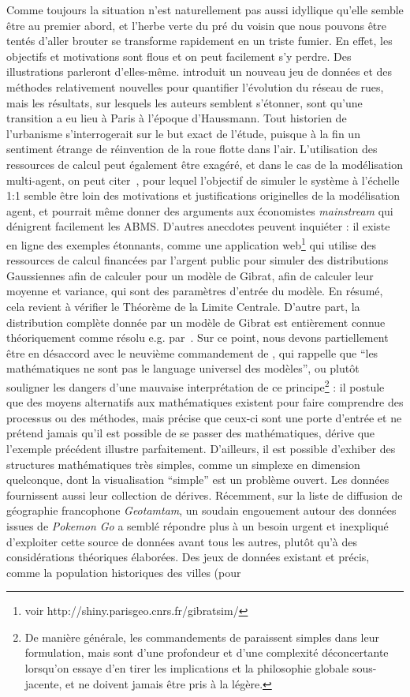 {Comme toujours la situation n'est naturellement pas aussi idyllique qu'elle semble être au premier abord, et l'herbe verte du pré du voisin que nous pouvons être tentés d'aller brouter se transforme rapidement en un triste fumier. En effet, les objectifs et motivations sont flous et on peut facilement s'y perdre. Des illustrations parleront d'elles-même. \cite{barthelemy2013self} introduit un nouveau jeu de données et des méthodes relativement nouvelles pour quantifier l'évolution du réseau de rues, mais les résultats, sur lesquels les auteurs semblent s'étonner, sont qu'une transition a eu lieu à Paris à l'époque d'Haussmann. Tout historien de l'urbanisme s'interrogerait sur le but exact de l'étude, puisque à la fin un sentiment étrange de réinvention de la roue flotte dans l'air. L'utilisation des ressources de calcul peut également être exagéré, et dans le cas de la modélisation multi-agent, on peut citer~\cite{axtell2016120}, pour lequel l'objectif de simuler le système à l'échelle 1:1 semble être loin des motivations et justifications originelles de la modélisation agent, et pourrait même donner des arguments aux économistes \emph{mainstream} qui dénigrent facilement les ABMS. D'autres anecdotes peuvent inquiéter :  il existe en ligne des exemples étonnants, comme une application web\footnote{voir http://shiny.parisgeo.cnrs.fr/gibratsim/} qui utilise des ressources de calcul financées par l'argent public pour simuler des distributions Gaussiennes afin de calculer pour un modèle de Gibrat, afin de calculer leur moyenne et variance, qui sont des paramètres d'entrée du modèle. En résumé, cela revient à vérifier le Théorème de la Limite Centrale. D'autre part, la distribution complète donnée par un modèle de Gibrat est entièrement connue théoriquement comme résolu e.g. par~\cite{gabaix1999zipf}. Sur ce point, nous devons partiellement être en désaccord avec le neuvième commandement de , qui rappelle que ``les mathématiques ne sont pas le language universel des modèles'', ou plutôt souligner les dangers d'une mauvaise interprétation de ce principe\footnote{De manière générale, les commandements de  paraissent simples dans leur formulation, mais sont d'une profondeur et d'une complexité déconcertante lorsqu'on essaye d'en tirer les implications et la philosophie globale sous-jacente, et ne doivent jamais être pris à la légère.} : il postule que des moyens alternatifs aux mathématiques existent pour faire comprendre des processus ou des méthodes, mais précise que ceux-ci sont une porte d'entrée et ne prétend jamais qu'il est possible de se passer des mathématiques, dérive que l'exemple précédent illustre parfaitement. D'ailleurs, il est possible d'exhiber des structures mathématiques très simples, comme un simplexe en dimension quelconque, dont la visualisation ``simple'' est un problème ouvert. Les données fournissent aussi leur collection de dérives. Récemment, sur la liste de diffusion de géographie francophone \emph{Geotamtam}, un soudain engouement autour des données issues de \emph{Pokemon Go} a semblé répondre plus à un besoin urgent et inexpliqué d'exploiter cette source de données avant tous les autres, plutôt qu'à des considérations théoriques élaborées. Des jeux de données existant et précis, comme la population historiques des villes (pour }
